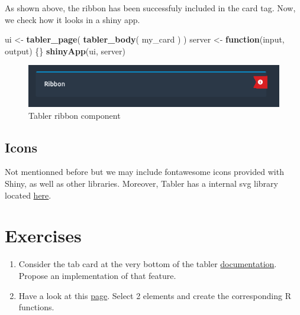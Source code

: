 \documentclass[
]{book}
\newenvironment{Shaded}{\begin{snugshade}}{\end{snugshade}}
\newcommand{\ControlFlowTok}[1]{\textcolor[rgb]{0.13,0.29,0.53}{\textbf{#1}}}
\newcommand{\KeywordTok}[1]{\textcolor[rgb]{0.13,0.29,0.53}{\textbf{#1}}}
\newcommand{\NormalTok}[1]{#1}
\newcommand{\StringTok}[1]{\textcolor[rgb]{0.31,0.60,0.02}{#1}}
\providecommand{\tightlist}{%
  \setlength{\itemsep}{0pt}\setlength{\parskip}{0pt}}
\begin{document}
As shown above, the ribbon has been successfuly included in the card tag. Now, we check how it looks in a shiny app.

\begin{Shaded}
\begin{Highlighting}[]
\NormalTok{ui <-}\StringTok{ }\KeywordTok{tabler_page}\NormalTok{(}
  \KeywordTok{tabler_body}\NormalTok{(}
\NormalTok{    my_card}
\NormalTok{  )}
\NormalTok{)}
\NormalTok{server <-}\StringTok{ }\ControlFlowTok{function}\NormalTok{(input, output) \{\}}
\KeywordTok{shinyApp}\NormalTok{(ui, server)}
\end{Highlighting}
\end{Shaded}

\begin{figure}
\includegraphics[width=7.58in]{images/practice/tabler-ribbon} \caption{Tabler ribbon component}\label{fig:tabler-ribbon}
\end{figure}

\hypertarget{icons}{%
\subsection{Icons}\label{icons}}

Not mentionned before but we may include fontawesome icons provided with Shiny, as well as other libraries. Moreover, Tabler has a internal svg library located \href{https://preview-dev.tabler.io/icons.html}{here}.

\hypertarget{exercises}{%
\section{Exercises}\label{exercises}}

\begin{enumerate}
\def\labelenumi{\arabic{enumi}.}
\tightlist
\item
  Consider the tab card at the very bottom of the tabler \href{https://preview-dev.tabler.io/docs/cards.html}{documentation}. Propose an implementation of that feature.
\item
  Have a look at this \href{https://preview-dev.tabler.io/snippets.html}{page}. Select 2 elements and create the corresponding R functions.
\end{enumerate}
\end{document}
